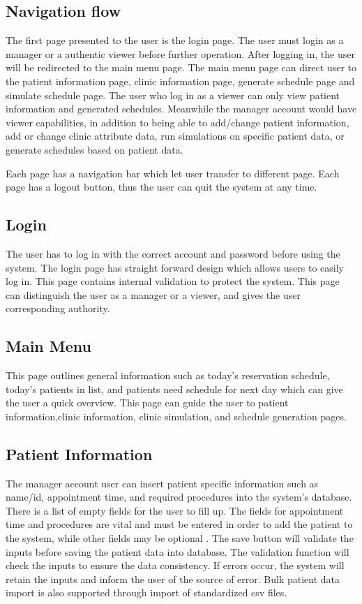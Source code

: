 \documentclass[12pt]{article}
\begin{document}
\subsection{Navigation flow}
The first page presented to the user is the login page. The user must login as a manager or a authentic viewer before further operation. After logging in, the user will be redirected to the main menu page. The main menu page can direct user to the patient information page, clinic information page, generate schedule page and simulate schedule page. The user who log in as a viewer can only view patient information and generated schedules. Meanwhile the manager account would have viewer capabilities, in addition to being able to add/change patient information, add or change clinic attribute data, run simulations on specific patient data, or generate schedules based on patient data.

\noindent \newline
Each page has a navigation bar which let user transfer to different page. Each page has a logout button, thus the user can quit the system at any time. \\

\subsection{Login}
The user has to log in with the correct account and password before using the system. The login page has straight forward design which allows users to easily log in. This page contains internal validation to protect the system. This page can distinguish the user as a manager or a viewer, and gives the user corresponding authority. 

\subsection{Main Menu}
This page outlines general information such as today’s reservation schedule, today’s patients in list, and patients need schedule for next day which can give the user a quick overview. This page can guide the user to patient information,clinic information, clinic simulation, and schedule generation pages.

\subsection{Patient Information}
The manager account user can insert patient specific information such as name/id, appointment time, and required procedures into the system’s database. There is a list of empty fields for the user to fill up. The fields for appointment time and procedures are vital and must be entered in order to add the patient to the system, while other fields may be optional . The save button will validate the inputs before saving the patient data into database. The validation function will check the inputs to ensure the data consistency. If errors occur, the system will retain the inputs and inform the user of the source of error. Bulk patient data import is also supported through import of standardized csv files.
\end{document}
